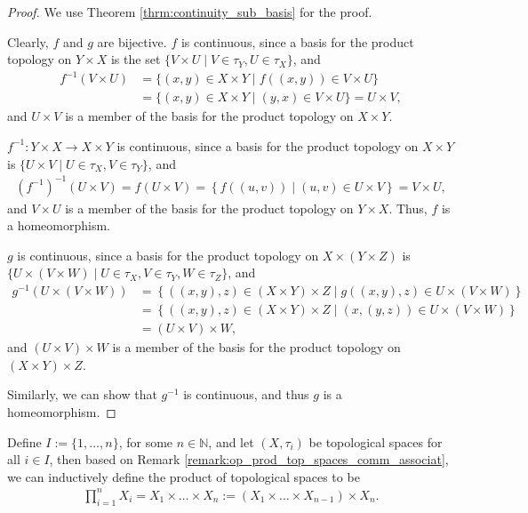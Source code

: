 \begin{proof}
	We use Theorem \ref{thrm:continuity_sub_basis} for the proof. 
	
	Clearly, $f$ and $g$ are bijective. $f$ is continuous, since a basis for the product topology on $Y\times X$ is the set $\{V\times U \mid V\in\tau_Y, U\in\tau_X \}$, and 
	\begin{align*}
		f^{-1}(V\times U) &= \{(x, y)\in X\times Y\mid f((x, y))\in V\times U\} \\ &= \{(x, y)\in X\times Y\mid (y, x)\in V\times U\} = U\times V,
	\end{align*}
	and $U\times V$ is a member of the basis for the product topology on $X\times Y$.
	
	$f^{-1}: Y\times X\to X\times Y$ is continuous, since a basis for the product topology on $X\times Y$ is $\{U\times V \mid U\in\tau_X, V\in\tau_Y \}$, and
	\begin{align*}
		\left(f^{-1}\right)^{-1}(U\times V) = f(U\times V) = \left\{f((u, v))\mid (u, v)\in U\times V\right\} = V\times U,
	\end{align*}
	and $V\times U$ is a member of the basis for the product topology on $Y\times X$.
	Thus, $f$ is a homeomorphism.
	
	$g$ is continuous, since a basis for the product topology on $X\times (Y\times Z)$ is $\{ U\times (V\times W) \mid U\in\tau_X, V\in\tau_Y, W\in\tau_Z\}$, and
	\begin{align*}
		g^{-1}(U\times (V\times W)) &= \left\{ ((x, y), z) \in (X\times Y)\times Z \mid g((x, y), z) \in U\times(V\times W) \right\}
		\\ &= \left\{ ((x, y), z) \in (X\times Y)\times Z \mid (x, (y, z)) \in U\times(V\times W) \right\}
		\\ &= (U\times V)\times W,
	\end{align*}
	and $(U\times V)\times W$ is a member of the basis for the product topology on $(X\times Y)\times Z$.
	
	Similarly, we can show that $g^{-1}$ is continuous, and thus $g$ is a homeomorphism.
\end{proof}

\begin{defn}
	Define $I := \{1, \dots, n\}$, for some $n\in\mathbb N$, and let $(X, \tau_i)$ be topological spaces for all $i\in I$, then based on Remark \ref{remark:op_prod_top_spaces_comm_associat}, we can inductively define the product of topological spaces to be 
	\begin{align}
		\prod_{i=1}^{n}X_i = X_1 \times \dots\times X_n := (X_1\times \dots\times X_{n-1})\times X_n.
	\end{align}
\end{defn}


